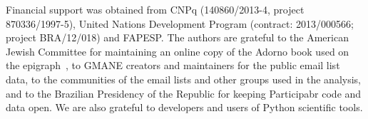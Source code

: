 \documentclass[%
	aip,
	jmp,%
	amsmath,amssymb,
	reprint,%
]{revtex4-1}
\begin{document}

\begin{acknowledgments}
	Financial support was obtained from CNPq (140860/2013-4,
	project 870336/1997-5), United Nations Development Program (contract: 2013/000566; project BRA/12/018) and FAPESP. 
	The authors are grateful to the American Jewish Committee for maintaining an online copy of the Adorno book used on the epigraph~\cite{adorno}, to GMANE creators and maintainers for the public email list data, to the communities of the email lists and other groups used in the analysis, and to the Brazilian Presidency of the Republic for keeping Participabr code and data open.
	We are also grateful to developers and users of Python scientific tools.
\end{acknowledgments}
\end{document}
